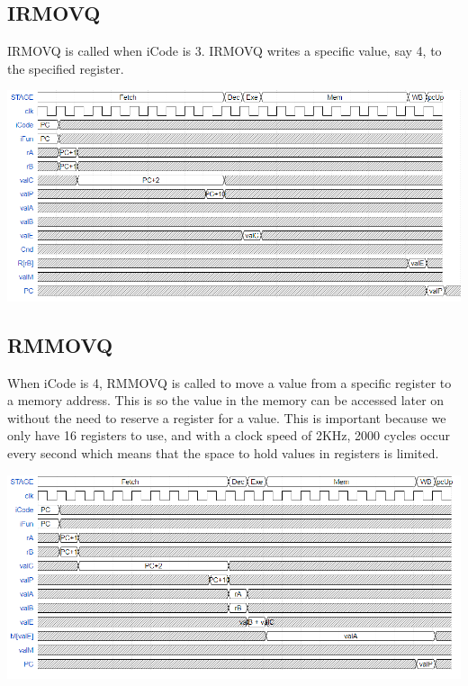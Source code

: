 \documentclass{article}
\begin{document}
\subsection{IRMOVQ}
IRMOVQ is called when iCode is 3. IRMOVQ writes a specific value, say 4, to the specified register. 
\begin{center}
    \includegraphics[scale=.6]{IRMOVQpic.png}
\end{center}
\pagebreak
\subsection{RMMOVQ}
When iCode is 4, RMMOVQ is called to move a value from a specific register to a memory address. This is so the value in the memory can be accessed later on without the need to reserve a register for a value. This is important because we only have 16 registers to use, and with a clock speed of 2KHz, 2000 cycles occur every second which means that the space to hold values in registers is limited. 
\begin{center}
    \includegraphics[scale=.6]{RMMOVQpic.png}
\end{center}
\end{document}
